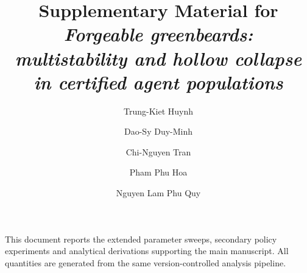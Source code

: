 \documentclass[11pt,a4paper]{article}
\title{Supplementary Material for\\
\emph{Forgeable greenbeards: multistability and hollow collapse in certified
agent populations}}
\author{Trung-Kiet Huynh \and Dao-Sy Duy-Minh \and Chi-Nguyen Tran \and
Pham Phu Hoa \and Nguyen Lam Phu Quy}
\date{}
\begin{document}
\maketitle

This document reports the extended parameter sweeps, secondary policy
experiments and analytical derivations supporting the main manuscript. All
quantities are generated from the same version-controlled analysis pipeline.
\end{document}
